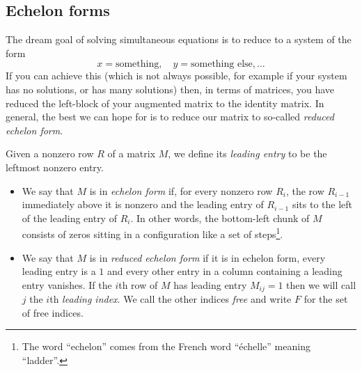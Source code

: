 \documentclass{article}
\begin{document}
\subsection{Echelon forms}


The dream goal of solving simultaneous equations is to reduce to a
system of the form \[x=\mbox{something},\quad y=\mbox{something
else},\ldots\] If you can achieve this (which is not always possible,
for example if your system has no solutions, or has many solutions)
then, in terms of matrices, you have reduced the left-block of your
augmented matrix to the identity matrix. In general, the best we can
hope for is to reduce our matrix to so-called {\em reduced echelon
form}.


\begin{Definition}\label{dfn:rowech}
Given a nonzero row \(R\) of a matrix \(M\), we define its {\em
leading entry} to be the leftmost nonzero entry.
\begin{itemize}
\item We say that \(M\) is in {\em echelon form} if, for every nonzero
row \(R_i\), the row \(R_{i-1}\) immediately above it is nonzero
and the leading entry of \(R_{i-1}\) sits to the left of the
leading entry of \(R_i\). In other words, the bottom-left chunk of
\(M\) consists of zeros sitting in a configuration like a set of
steps\footnote{The word ``echelon'' comes from the French word
``\'{e}chelle'' meaning ``ladder''.}.
\item We say that \(M\) is in {\em reduced echelon form} if it is in
echelon form, every leading entry is a \(1\) and every other entry
in a column containing a leading entry vanishes. If the \(i\)th
row of \(M\) has leading entry \(M_{ij}=1\) then we will call
\(j\) the \(i\)th {\em leading index}. We call the other indices
{\em free} and write \(F\) for the set of free indices.


\end{itemize}
\end{Definition}
\end{document}
